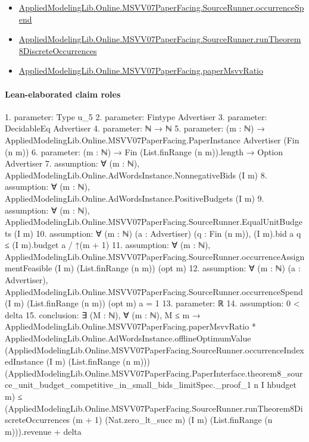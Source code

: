 \documentclass[10pt]{article}
\begin{document}
\begin{itemize}
\item \hyperlink{governing-declaration-7fc0f371ea84f275}{Applied\allowbreak{}Modeling\allowbreak{}Lib.\allowbreak{}Online.\allowbreak{}MSVV07\allowbreak{}Paper\allowbreak{}Facing.\allowbreak{}Source\allowbreak{}Runner.\allowbreak{}occurrence\allowbreak{}Spend}
\item \hyperlink{governing-declaration-d071ebd3a5ae7962}{Applied\allowbreak{}Modeling\allowbreak{}Lib.\allowbreak{}Online.\allowbreak{}MSVV07\allowbreak{}Paper\allowbreak{}Facing.\allowbreak{}Source\allowbreak{}Runner.\allowbreak{}run\allowbreak{}Theorem8\allowbreak{}Discrete\allowbreak{}Occurrences}
\item \hyperlink{governing-declaration-11865634591d1a39}{Applied\allowbreak{}Modeling\allowbreak{}Lib.\allowbreak{}Online.\allowbreak{}MSVV07\allowbreak{}Paper\allowbreak{}Facing.\allowbreak{}paper\allowbreak{}Msvv\allowbreak{}Ratio}
\end{itemize}
\paragraph{Lean-elaborated claim roles}\begin{ReviewVerbatim}
1. parameter: Type u_5
2. parameter: Fintype Advertiser
3. parameter: DecidableEq Advertiser
4. parameter: ℕ → ℕ
5. parameter: (m : ℕ) → AppliedModelingLib.Online.MSVV07PaperFacing.PaperInstance Advertiser (Fin (n m))
6. parameter: (m : ℕ) → Fin (List.finRange (n m)).length → Option Advertiser
7. assumption: ∀ (m : ℕ), AppliedModelingLib.Online.AdWordsInstance.NonnegativeBids (I m)
8. assumption: ∀ (m : ℕ), AppliedModelingLib.Online.AdWordsInstance.PositiveBudgets (I m)
9. assumption: ∀ (m : ℕ), AppliedModelingLib.Online.MSVV07PaperFacing.SourceRunner.EqualUnitBudgets (I m)
10. assumption: ∀ (m : ℕ) (a : Advertiser) (q : Fin (n m)), (I m).bid a q ≤ (I m).budget a / ↑(m + 1)
11. assumption: ∀ (m : ℕ),
  AppliedModelingLib.Online.MSVV07PaperFacing.SourceRunner.occurrenceAssignmentFeasible (I m) (List.finRange (n m))
    (opt m)
12. assumption: ∀ (m : ℕ) (a : Advertiser),
  AppliedModelingLib.Online.MSVV07PaperFacing.SourceRunner.occurrenceSpend (I m) (List.finRange (n m)) (opt m) a = 1
13. parameter: ℝ
14. assumption: 0 < delta
15. conclusion: ∃ (M : ℕ),
  ∀ (m : ℕ),
    M ≤ m →
      AppliedModelingLib.Online.MSVV07PaperFacing.paperMsvvRatio *
          AppliedModelingLib.Online.AdWordsInstance.offlineOptimumValue
            (AppliedModelingLib.Online.MSVV07PaperFacing.SourceRunner.occurrenceIndexedInstance (I m)
              (List.finRange (n m)))
            (AppliedModelingLib.Online.MSVV07PaperFacing.PaperInterface.theorem8_source_unit_budget_competitive_in_small_bids_limitSpec._proof_1
              n I hbudget m) ≤
        (AppliedModelingLib.Online.MSVV07PaperFacing.SourceRunner.runTheorem8DiscreteOccurrences (m + 1)
              (Nat.zero_lt_succ m) (I m) (List.finRange (n m))).revenue +
          delta
\end{ReviewVerbatim}
\end{document}
